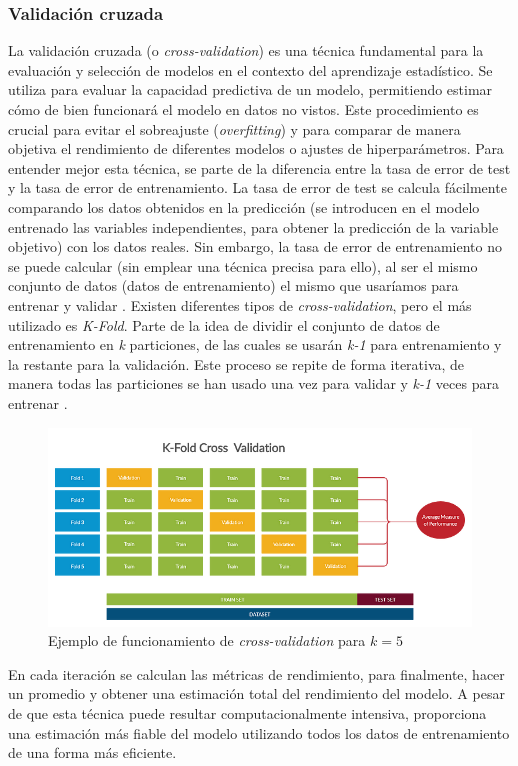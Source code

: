 \documentclass[12pt,a4paper,Spanish]{article}
\begin{document}
\subsubsection{Validación cruzada}\label{cross-validation}
La validación cruzada (o \textit{cross-validation}) es una técnica fundamental para la evaluación y selección de modelos en el contexto del aprendizaje estadístico. Se utiliza para evaluar la capacidad predictiva de un modelo, permitiendo estimar cómo de bien funcionará el modelo en datos no vistos. Este procedimiento es crucial para evitar el sobreajuste (\textit{overfitting}) y para comparar de manera objetiva el rendimiento de diferentes modelos o ajustes de hiperparámetros.
\newline
Para entender mejor esta técnica, se parte de la diferencia entre la tasa de error de test y la tasa de error de entrenamiento. La tasa de error de test se calcula fácilmente comparando los datos obtenidos en la predicción (se introducen en el modelo entrenado las variables independientes, para obtener la predicción de la variable objetivo) con los datos reales. Sin embargo, la tasa de error de entrenamiento no se puede calcular (sin emplear una técnica precisa para ello), al ser el mismo conjunto de datos (datos de entrenamiento) el mismo que usaríamos para entrenar y validar \cite{gareth2013introduction}.
\newline
Existen diferentes tipos de \textit{cross-validation}, pero el más utilizado es \textit{K-Fold}. Parte de la idea de dividir el conjunto de datos de entrenamiento en \textit{k} particiones, de las cuales se usarán \textit{k-1} para entrenamiento y la restante para la validación. Este proceso se repite de forma iterativa, de manera todas las particiones se han usado una vez para validar y \textit{k-1} veces para entrenar \cite{hastie2009elements}.
\begin{figure}[H]
	\centering
	\includegraphics[width=0.7\linewidth]{figs/cross-validation}
	\caption{Ejemplo de funcionamiento de \textit{cross-validation} para $k = 5$}
	\label{fig:cross-validation}
\end{figure}
En cada iteración se calculan las métricas de rendimiento, para finalmente, hacer un promedio y obtener una estimación total del rendimiento del modelo.
A pesar de que esta técnica puede resultar computacionalmente intensiva, proporciona una estimación más fiable del modelo utilizando todos los datos de entrenamiento de una forma más eficiente.
\end{document}
